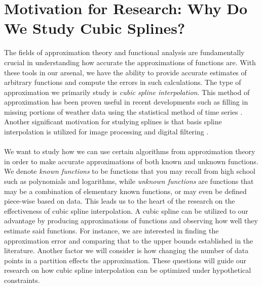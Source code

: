 \section{Motivation for Research: Why Do We Study Cubic Splines?}
The fields of approximation theory and functional analysis are fundamentally crucial in understanding how accurate the approximations of functions are. With these tools in our arsenal, we have the ability to provide accurate estimates of arbitrary functions and compute the errors in such calculations. The type of approximation we primarily study is \emph{cubic spline interpolation}. This method of approximation has been proven useful in recent developments such as filling in missing portions of weather data using the statistical method of time series \cite{key1}. Another significant motivation for studying splines is that basis spline interpolation is utilized for image processing and digital filtering \cite{key2}.
\\\\
We want to study how we can use certain algorithms from approximation theory in order to make accurate approximations of both known and unknown functions. We denote \emph{known functions} to be functions that you may recall from high school such as polynomials and logarithms, while \emph{unknown functions} are functions that may be a combination of elementary known functions, or may even be defined piece-wise based on data. This leads us to the heart of the research on the effectiveness of cubic spline interpolation. A cubic spline can be utilized to our advantage by producing approximations of functions and observing how well they estimate said functions. For instance, we are interested in finding the approximation error and comparing that to the upper bounds established in the literature. Another factor we will consider is how changing the number of data points in a partition effects the approximation. These questions will guide our research on how cubic spline interpolation can be optimized under hypothetical constraints. 